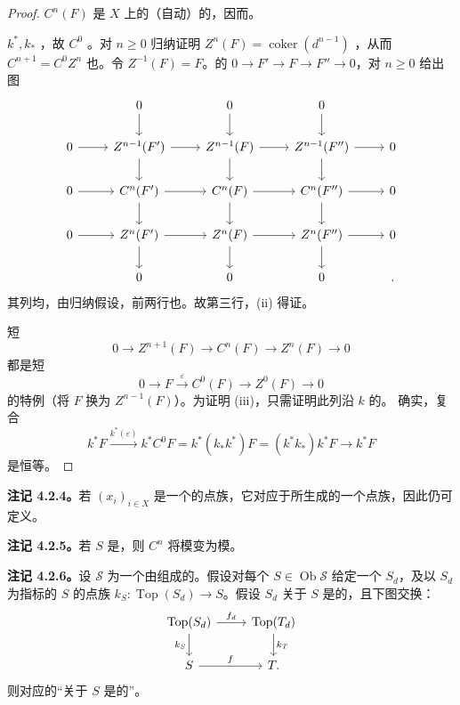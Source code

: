 \begin{proof}
$C^n(F)$ 是 $X$ 上的（自动）的，因而。

 $k^*,k_*$ ，故 $C^0$ 。对 $n\ge0$ 归纳证明 $Z^n(F)=\operatorname{coker}(d^{n-1})$ ，从而 $C^{n+1}=C^0Z^n$ 也。令 $Z^{-1}(F)=F$。的 $0\to F'\to F\to F''\to0$，对 $n\ge0$ 给出图
\[\begin{tikzcd}&0\arrow[d]&0\arrow[d]&0\arrow[d]&\\0\arrow[r]&Z^{n-1}(F')\arrow[r]\arrow[d]&Z^{n-1}(F)\arrow[r]\arrow[d]&Z^{n-1}(F'')\arrow[r]\arrow[d]&0\\0\arrow[r]&C^n(F')\arrow[r]\arrow[d]&C^n(F)\arrow[r]\arrow[d]&C^n(F'')\arrow[r]\arrow[d]&0\\0\arrow[r]&Z^n(F')\arrow[r]\arrow[d]&Z^n(F)\arrow[r]\arrow[d]&Z^n(F'')\arrow[r]\arrow[d]&0\\&0&0&0&.\end{tikzcd}\]
其列均，由归纳假设，前两行也。故第三行，(ii) 得证。

短
\[0\longrightarrow Z^{n+1}(F)\longrightarrow C^n(F)\longrightarrow Z^n(F)\longrightarrow0\]
都是短
\[0\longrightarrow F\xrightarrow{\varepsilon}C^0(F)\longrightarrow Z^0(F)\longrightarrow0\tag{4.2.3.1}\]
的特例（将 $F$ 换为 $Z^{n-1}(F)$）。为证明 (iii)，只需证明此列沿 $k$ 的。
确实，复合
\[k^*F\xrightarrow{k^*(\varepsilon)}k^*C^0F=k^*(k_*k^*)F=(k^*k_*)k^*F\longrightarrow k^*F\]
是恒等。
\end{proof}
\textbf{注记 4.2.4。}若 $(x_i)_{i\in X}$ 是一个的点族，它对应于所生成的一个点族，因此仍可定义。

\textbf{注记 4.2.5。}若 $S$ 是，则 $C^n$ 将模变为模。

\textbf{注记 4.2.6。}设 $\mathscr S$ 为一个由组成的。假设对每个 $S\in\operatorname{Ob}\mathscr S$ 给定一个 $S_d$，及以 $S_d$ 为指标的 $S$ 的点族 $k_S:\operatorname{Top}(S_d)\to S$。假设 $S_d$ 关于 $S$ 是的，且下图交换：
\[\begin{tikzcd}\operatorname{Top}(S_d)\arrow[r,"f_d"]\arrow[d,"k_S"']&\operatorname{Top}(T_d)\arrow[d,"k_T"]\\S\arrow[r,"f"]&T.\end{tikzcd}\]
则对应的“关于 $S$ 是的”。

